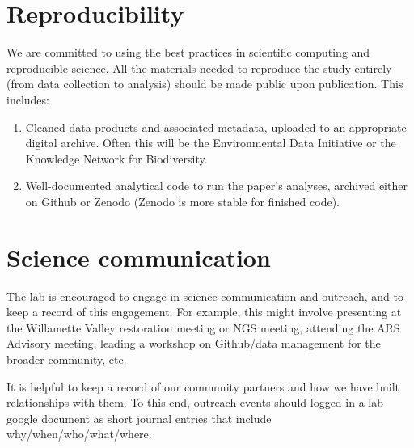 \documentclass[12pt]{article}
\begin{document}
\section{Reproducibility}
We are committed to using the best practices in scientific computing
and reproducible science. All the
materials needed to reproduce the study entirely (from data collection
to analysis) should be made public upon publication. This includes:
\begin{enumerate}
\item Cleaned data products and associated metadata, uploaded to an appropriate digital archive. Often this will be the Environmental Data Initiative or the Knowledge Network for Biodiversity.
\item Well-documented analytical code to run the  paper's analyses, archived either on Github or Zenodo (Zenodo is more stable for finished code).
\end{enumerate}


\section{Science communication}
The lab is encouraged to engage in science communication and outreach, and to keep a record of this engagement. For example, this might involve presenting at the Willamette Valley restoration meeting or NGS meeting, attending the ARS Advisory meeting, leading a workshop on Github/data management for the broader community, etc. 

It is helpful to keep a record of our community partners and how we have built relationships with them. To this end, outreach events should logged in a lab google document as short journal entries that include why/when/who/what/where.
\end{document}
